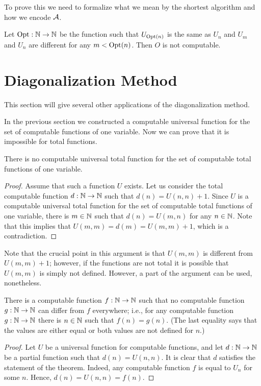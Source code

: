 To prove this we need to formalize what we mean by the shortest algorithm and
how we encode $\mathcal{A}$.
\begin{theorem}
  Let $\mathrm{Opt} : {\mathbb{N}} \to {\mathbb{N}}$ be the function such that
  $U_{\mathrm{Opt}(n)}$ is the same as $U_n$ and $U_m$ and $U_n$ are different
  for any $m < \mathrm{Opt}(n)$. Then $O$ is not computable.
\end{theorem}


\section{Diagonalization Method}
This section will give several other applications of the diagonalization method.

In the previous section we constructed a computable universal function for
the set of computable functions of one variable. Now we can prove that
it is impossible for total functions.
\begin{theorem}
    There is no computable universal total function for
    the set of computable total functions of one variable.
\end{theorem}
\begin{proof}
  Assume that such a function $U$ exists. Let us consider the total computable
  function $d : {\mathbb{N}} \to {\mathbb{N}}$ such that $d(n) = U(n, n) + 1$. Since $U$ is a
  computable universal total function for the set of computable total functions
  of one variable, there is $m \in {\mathbb{N}}$ such that $d(n) = U(m, n)$ for any
  $n \in {\mathbb{N}}$. Note that this implies that $U(m, m) = d(m) = U(m, m) + 1$,
  which is a contradiction.
\end{proof}
Note that the crucial point in this argument is that $U(m, m)$ is different
from $U(m, m) + 1$; however, if the functions are not total it is possible
that $U(m, m)$ is simply not defined. However, a part of the argument can be
used, nonetheless.
\begin{theorem}
    There is a computable function $f : {\mathbb{N}} \to {\mathbb{N}}$ such that
    no computable function $g : {\mathbb{N}} \to {\mathbb{N}}$ can differ from $f$
    everywhere; i.e., for any computable function $g : {\mathbb{N}} \to {\mathbb{N}}$
    there is $n \in {\mathbb{N}}$ such that $f(n) = g(n)$.
    (The last equality says that the values are either equal or
    both values are not defined for $n$.)
\end{theorem}
\begin{proof}
  Let $U$ be a universal function for computable functions, and
  let $d : {\mathbb{N}} \to {\mathbb{N}}$ be a partial function such that $d(n) = U(n, n)$.
  It is clear that $d$ satisfies the statement of the theorem. Indeed,
  any computable function $f$ is equal to $U_n$  for some $n$. Hence,
  $d(n) = U(n, n) = f(n)$.
\end{proof}

